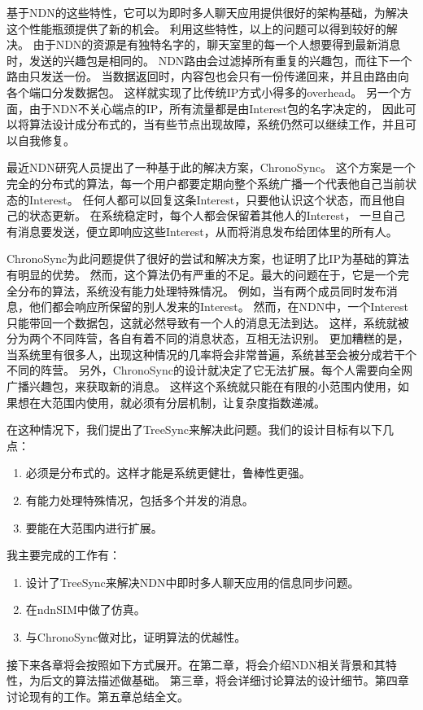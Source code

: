 基于NDN的这些特性，它可以为即时多人聊天应用提供很好的架构基础，为解决这个性能瓶颈提供了新的机会。
利用这些特性，以上的问题可以得到较好的解决。
由于NDN的资源是有独特名字的，聊天室里的每一个人想要得到最新消息时，发送的兴趣包是相同的。
NDN路由会过滤掉所有重复的兴趣包，而往下一个路由只发送一份。
当数据返回时，内容包也会只有一份传递回来，并且由路由向各个端口分发数据包。
这样就实现了比传统IP方式小得多的overhead。
另一个方面，由于NDN不关心端点的IP，所有流量都是由Interest包的名字决定的，
因此可以将算法设计成分布式的，当有些节点出现故障，系统仍然可以继续工作，并且可以自我修复。

最近NDN研究人员提出了一种基于此的解决方案，ChronoSync。
这个方案是一个完全的分布式的算法，每一个用户都要定期向整个系统广播一个代表他自己当前状态的Interest。
任何人都可以回复这条Interest，只要他认识这个状态，而且他自己的状态更新。
在系统稳定时，每个人都会保留着其他人的Interest，
一旦自己有消息要发送，便立即响应这些Interest，从而将消息发布给团体里的所有人。

ChronoSync为此问题提供了很好的尝试和解决方案，也证明了比IP为基础的算法有明显的优势。
然而，这个算法仍有严重的不足。最大的问题在于，它是一个完全分布的算法，系统没有能力处理特殊情况。
例如，当有两个成员同时发布消息，他们都会响应所保留的别人发来的Interest。
然而，在NDN中，一个Interest只能带回一个数据包，这就必然导致有一个人的消息无法到达。
这样，系统就被分为两个不同阵营，各自有着不同的消息状态，互相无法识别。
更加糟糕的是，当系统里有很多人，出现这种情况的几率将会非常普遍，系统甚至会被分成若干个不同的阵营。
另外，ChronoSync的设计就决定了它无法扩展。每个人需要向全网广播兴趣包，来获取新的消息。
这样这个系统就只能在有限的小范围内使用，如果想在大范围内使用，就必须有分层机制，让复杂度指数递减。

在这种情况下，我们提出了TreeSync来解决此问题。我们的设计目标有以下几点：

\begin{enumerate}
  \item 必须是分布式的。这样才能是系统更健壮，鲁棒性更强。
  \item 有能力处理特殊情况，包括多个并发的消息。
  \item 要能在大范围内进行扩展。
\end{enumerate}

我主要完成的工作有：

\begin{enumerate}
  \item 设计了TreeSync来解决NDN中即时多人聊天应用的信息同步问题。
  \item 在ndnSIM中做了仿真。
  \item 与ChronoSync做对比，证明算法的优越性。
\end{enumerate}

接下来各章将会按照如下方式展开。在第二章，将会介绍NDN相关背景和其特性，为后文的算法描述做基础。
第三章，将会详细讨论算法的设计细节。第四章讨论现有的工作。第五章总结全文。
